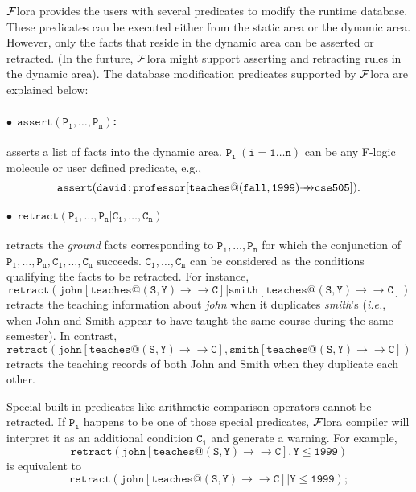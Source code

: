 \documentclass[11pt]{article}
\newcommand{\isa}{\,{\bf{:}}\,}
\newcommand{\mvd}{\ensuremath{{\rightarrow\!\!\!\!\rightarrow}}}  %
\newcommand{\FLORA}{{\mbox{${\cal F}${\sc lora}}}\xspace}
\newcommand{\fl}{{F-logic}\xspace}
\begin{document}
\FLORA provides the users with several predicates to modify the runtime
database.  These predicates can be executed either from the static area or
the dynamic area. However, only the facts that reside in the dynamic area
can be asserted or retracted. (In the furture, \FLORA might support 
asserting and retracting rules in the dynamic area). The database
modification predicates supported by
\FLORA are explained below:

\paragraph{$\bullet~~\mathtt{assert(P_1,\ldots,P_n)}$:} asserts a list of facts
into the dynamic area.
$\mathtt{P_i~(i=1{\ldots}n)}$ can be any \mbox{\fl} molecule or user defined
predicate, e.g.,
\[\mathtt{assert(david{\isa}professor[teaches@(fall,1999){\mvd}cse505])}.\]

\paragraph{$\bullet~~\mathtt{retract(P_1,\ldots,P_n | C_1,\ldots,C_n)}$}
retracts the \emph{ground} facts corresponding to $\mathtt{P_1,\ldots,P_n}$ for
which the conjunction of $\mathtt{P_1,\ldots,P_n,C_1,\ldots,C_n}$ succeeds.
$\mathtt{C_1,\ldots,C_n}$ can be considered as the conditions qualifying
the facts to be retracted.  For instance,
\[
\mathtt{retract(john[teaches@(S,Y){\mvd}C]|smith[teaches@(S,Y){\mvd}C])}
\]
retracts the teaching information about {\it john} when it duplicates {\it
  smith}'s ({\it i.e.}, when John and Smith appear to have taught the same
course during the same semester). In contrast,
\[
\mathtt{retract(john[teaches@(S,Y){\mvd}C],smith[teaches@(S,Y){\mvd}C])}
\]
retracts the teaching records of both John and Smith when they duplicate
each other.

Special built-in predicates like arithmetic comparison operators cannot be
retracted.  If $\mathtt{P_i}$ happens to be one of those special
predicates, \FLORA compiler will interpret it as an additional condition
$\mathtt{C_i}$ and generate a warning. For example,
\begin{displaymath}
\mathtt{retract(john[teaches@(S,Y){\mvd}C],Y\leq1999)}
\end{displaymath}
is equivalent to
\begin{displaymath}
\mathtt{retract(john[teaches@(S,Y){\mvd}C]|Y\leq1999)};
\end{displaymath}
\end{document}
